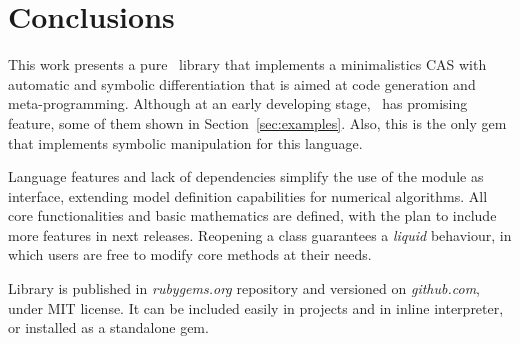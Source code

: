 
\section{Conclusions}
\label{sec:conclusions}

This work presents a pure \Ruby~library that implements a minimalistics CAS with
automatic and symbolic differentiation that is aimed at code generation and meta-programming.
Although at an early developing stage, \ragnicas~has promising feature, some of them
shown in Section~\ref{sec:examples}. Also, this is the only gem that implements
symbolic manipulation for this language.

Language features and lack of dependencies simplify the use of the module as interface, extending model definition
capabilities for numerical algorithms. All core functionalities and basic mathematics are defined, with the plan to include more features in next releases. Reopening a class guarantees a
\emph{liquid} behaviour, in which users are free to modify core methods at their needs.

Library is published in \emph{rubygems.org} repository and versioned on \emph{github.com}, under MIT license.
It can be included easily in projects and in inline interpreter, or installed as a standalone gem.
